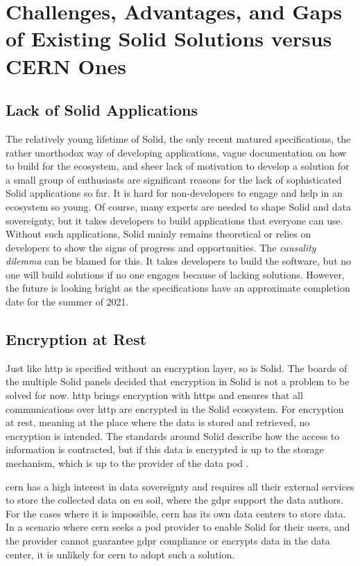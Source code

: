 \section{Challenges, Advantages, and Gaps of Existing Solid Solutions versus CERN Ones}

\subsection{Lack of Solid Applications}\label{challenges:lack}

The relatively young lifetime of Solid, the only recent matured specifications, the rather unorthodox way of developing applications, vague documentation on how to build for the ecosystem, and sheer lack of motivation to develop a solution for a small group of enthusiasts are significant reasons for the lack of sophisticated Solid applications so far. It is hard for non-developers to engage and help in an ecosystem so young. Of course, many experts are needed to shape Solid and data sovereignty, but it takes developers to build applications that everyone can use. Without such applications, Solid mainly remains theoretical or relies on developers to show the signs of progress and opportunities. The \textit{causality dilemma} can be blamed for this. It takes developers to build the software, but no one will build solutions if no one engages because of lacking solutions. However, the future is looking bright as the specifications have an approximate completion date for the summer of 2021.

\subsection{Encryption at Rest}

Just like \gls{http} is specified without an encryption layer, so is Solid. The boards of the multiple Solid panels \cite{solid-panels} decided that encryption in Solid is not a problem to be solved for now. \gls{http} brings encryption with \gls{https} and ensures that all communications over \gls{http} are encrypted in the Solid ecosystem. For encryption at rest, meaning at the place where the data is stored and retrieved, no encryption is intended. The standards around Solid describe how the access to information is contracted, but if this data is encrypted is up to the storage mechanism, which is up to the provider of the data pod \cite{solidproject-faqs}.

\gls{cern} has a high interest in data sovereignty and requires all their external services to store the collected data on \gls{eu} soil, where the \gls{gdpr} support the data authors. For the cases where it is impossible, \gls{cern} has its own data centers to store data. In a scenario where \gls{cern} seeks a pod provider to enable Solid for their users, and the provider cannot guarantee \gls{gdpr} compliance or encrypts data in the data center, it is unlikely for \gls{cern} to adopt such a solution.

